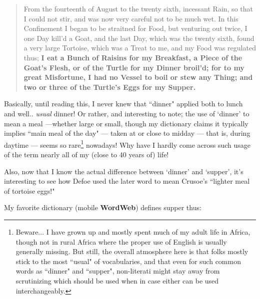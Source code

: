 \documentclass[a4paper]{article}
\begin{document}
\noindent
\begin{minipage}{1\textwidth}
\vspace{1em}
\begin{quotation}
{\ttfamily


From the fourteenth of August to the twenty sixth, incessant Rain, so that I could not stir, and was now very careful not to be much wet. In this Confinement I began to be straitned for Food, but venturing out twice, I one Day kill’d a Goat, and the last Day, which was the twenty sixth, found a very large Tortoise, which was a Treat to me, and my Food was regulated thus; \textbf{I eat a Bunch of Raisins for my Breakfast, a Piece of the Goat’s Flesh, or of the Turtle for my Dinner broil’d; for to my great Misfortune, I had no Vessel to boil or stew any Thing; and two or three of the Turtle’s Eggs for my Supper.}

}
\end{quotation}
\vspace{1em}
\end{minipage}



Basically, until reading this, I never knew that  ``dinner" applied both to lunch and well.. \textit{usual} dinner! Or rather, and interesting to note; the use of `dinner' to mean a meal ---whether large or small, though my dictionary claims it typically implies ``main meal of the day" --- taken at or close to midday --- that is, during daytime --- seems so rare\footnote{Beware... I have grown up and mostly spent much of my adult life in Africa, though not in rural Africa where the proper use of English is usually generally missing. But still, the overall atmosphere here is that folks mostly stick to the most ``usual" of vocabularies, and that even for such common words as ``dinner" and ``supper", non-literati might stay away from scrutinizing which should be used when in case either can be used interchangeably.} nowadays! Why have I hardly come across such usage of the term nearly all of my (close to 40 years of) life!

Also, now that I know the actual difference between `dinner' and `supper', it's interesting to see how Defoe used the later word to mean Crusoe's ``lighter meal of tortoise eggs!" 

My favorite dictionary (mobile \textbf{WordWeb}) defines supper thus:
\end{document}
